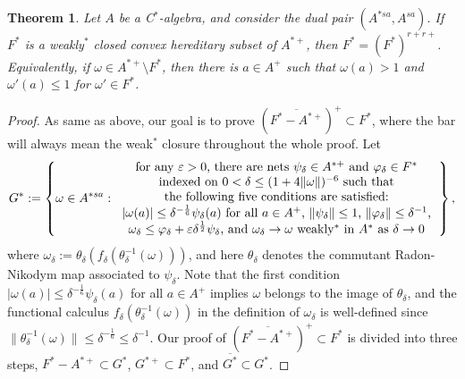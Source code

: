 \documentclass[noamsfonts,a4paper,10pt]{amsart}
\theoremstyle{plain}
\newtheorem{thm}{Theorem}[section]
\theoremstyle{definition}
\theoremstyle{remark}
\begin{document}
\begin{thm}\label{4}
Let $A$ be a C$^*$-algebra, and consider the dual pair $(A^{*sa},A^{sa})$.
If $F^*$ is a weakly$^*$ closed convex hereditary subset of $A^{*+}$, then $F^*=(F^*)^{r+r+}$.
Equivalently, if $\omega\in A^{*+}\setminus F^*$, then there is $a\in A^+$ such that $\omega(a)>1$ and $\omega'(a)\le1$ for $\omega'\in F^*$.
\end{thm}
\begin{proof}
As same as above, our goal is to prove $(\overline{F^*-A^{*+}})^+\subset F^*$, where the bar will always mean the weak$^*$ closure throughout the whole proof.
Let
\[G^*:=\left\{\omega\in A^{*sa}:\begin{tabular}{c}
for any $\varepsilon>0$, there are nets $\psi_\delta\in A^{*+}$ and $\varphi_\delta\in F^*$\\
indexed on $0<\delta\le(1+4\|\omega\|)^{-6}$ such that\\
the following five conditions are satisfied:\\
 $|\omega(a)|\le\delta^{-\frac16}\psi_\delta(a)$ for all $a\in A^+$, $\|\psi_\delta\|\le1$, $\|\varphi_\delta\|\le\delta^{-1}$,\\
$\omega_\delta\le\varphi_\delta+\varepsilon\delta^{\frac12}\psi_\delta$, and $\omega_\delta\to\omega$ weakly$^*$ in $A^*$ as $\delta\to0$
\end{tabular}\right\},\]
where $\omega_\delta:=\theta_\delta(f_\delta(\theta_\delta^{-1}(\omega)))$, and here $\theta_\delta$ denotes the commutant Radon-Nikodym map associated to $\psi_\delta$.
Note that the first condition $|\omega(a)|\le\delta^{-\frac16}\psi_\delta(a)$ for all $a\in A^+$ implies $\omega$ belongs to the image of $\theta_\delta$, and the functional calculus $f_\delta(\theta_\delta^{-1}(\omega))$ in the definition of $\omega_\delta$ is well-defined since $\|\theta_\delta^{-1}(\omega)\|\le\delta^{-\frac16}\le\delta^{-1}$.
Our proof of $(\overline{F^*-A^{*+}})^+\subset F^*$ is divided into three steps, $F^*-A^{*+}\subset G^*$, $G^{*+}\subset F^*$, and $\overline{G^*}\subset G^*$.



\end{proof}
\end{document}
